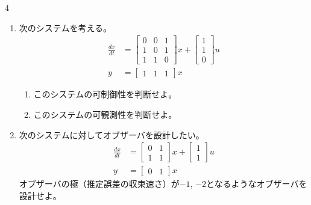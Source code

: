 \documentclass[fleqn]{article}
\renewcommand{\bmatrix}{\left[\begin{array}}
\newcommand{\ematrix}{\end{array}\right]}
\begin{document}
\begin{multicols}{4}
\begin{enumerate}





\item
次のシステムを考える。
\begin{align}
	\frac{dx}{dt}
	&=	\bmatrix{ccc}
			0 & 0 & 1\\
			1 & 0 & 1\\
			1 & 1 & 0
		\ematrix
		x
		+
		\bmatrix{c}
			1 \\
			1 \\
			0 
		\ematrix
		u
\nonumber \\
	y 
	&=	\bmatrix{ccc}
			1 & 1 & 1
		\ematrix
		x
\nonumber 
\end{align}


\begin{enumerate}

\item
このシステムの可制御性を判断せよ。
\vspace{11.5cm}

\item
このシステムの可観測性を判断せよ。
\vspace{11.5cm}
\end{enumerate}
\vfill\null
\columnbreak






\item
次のシステムに対してオブザーバを設計したい。
\begin{align}
	\frac{dx}{dt}
	&=	\bmatrix{cc}
			0 & 1 \\
			1 & 1
		\ematrix
		x
		+
		\bmatrix{c}
			1 \\
			1 
		\ematrix
		u
\nonumber \\
	y 
	&=	\bmatrix{cc}
			0 & 1 
		\ematrix
		x
\nonumber 
\end{align}
オブザーバの極（推定誤差の収束速さ）が$-1$, $-2$となるようなオブザーバを設計せよ。
\vfill\null
\columnbreak







\end{enumerate}
\end{multicols}
\end{document}
